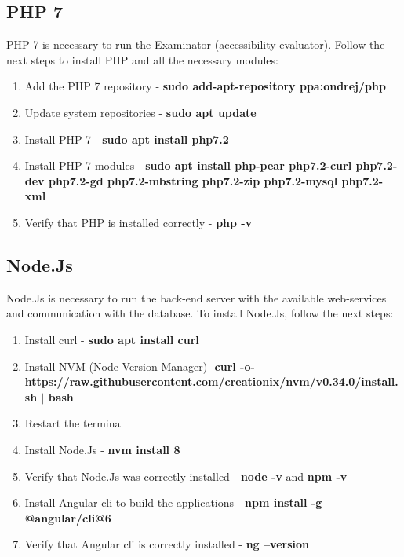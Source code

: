 \subsection{PHP 7}

PHP 7 is necessary to run the Examinator (accessibility evaluator). Follow the next steps to install PHP and all the necessary modules:

\begin{enumerate}
    \item Add the PHP 7 repository - \textbf{sudo add-apt-repository ppa:ondrej/php}
    \item Update system repositories - \textbf{sudo apt update}
    \item Install PHP 7 - \textbf{sudo apt install php7.2}
    \item Install PHP 7 modules - \textbf{sudo apt install php-pear php7.2-curl php7.2-dev php7.2-gd php7.2-mbstring php7.2-zip php7.2-mysql php7.2-xml}
    \item Verify that PHP is installed correctly - \textbf{php -v}
\end{enumerate}

\subsection{Node.Js}

Node.Js is necessary to run the back-end server with the available web-services and communication with the database. To install Node.Js, follow the next steps:

\begin{enumerate}
    \item Install curl - \textbf{sudo apt install curl}
    \item Install NVM (Node Version Manager) -\newline\textbf{curl -o- https://raw.githubusercontent.com/creationix/nvm/v0.34.0/install.sh $|$ bash}
    \item Restart the terminal
    \item Install Node.Js - \textbf{nvm install 8}
    \item Verify that Node.Js was correctly installed - \textbf{node -v} and \textbf{npm -v}
    \item Install Angular cli to build the applications - \textbf{npm install -g @angular/cli@6}
    \item Verify that Angular cli is correctly installed - \textbf{ng --version}
\end{enumerate}


